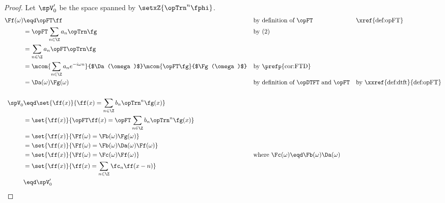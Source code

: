 \begin{proof}
Let $\spV_0'$ be the space spanned by $\setxZ{\opTrn^n\fphi}$.
\begin{align*}
  \Ff(\omega)
    &\eqd \opFT\ff
    &&    \text{by definition of $\opFT$}
    &&    \text{\xref{def:opFT}}
  \\&=    \opFT\sum_{n\in\Z} a_n \opTrn\fg
    &&    \text{by (2)}
  \\&=    \sum_{n\in\Z} a_n \opFT\opTrn\fg
  \\&=    \mcom{\sum_{n\in\Z} a_n e^{-i\omega n}}{$\Da(\omega)$}\mcom{\opFT\fg}{$\Fg(\omega)$}
    &&    \text{by \prefp{cor:FTD}}
  \\&=    \Da(\omega)\Fg(\omega)
    &&    \text{by definition of $\opDTFT$ and $\opFT$}
    &&    \text{by \xxref{def:dtft}{def:opFT}}
\\
\\
  \spV_0
    &\eqd \set{\ff(x)}{\ff(x)=\sum_{n\in\Z} b_n \opTrn^n\fg(x)}
  \\&=    \set{\ff(x)}{\opFT\ff(x)=\opFT\sum_{n\in\Z} b_n \opTrn^n\fg(x)}
  \\&=    \set{\ff(x)}{\Ff(\omega)=\Fb(\omega) \Fg(\omega) }
  \\&=    \set{\ff(x)}{\Ff(\omega)=\Fb(\omega) \Da(\omega) \Ff(\omega) }
  \\&=    \set{\ff(x)}{\Ff(\omega)=\Fc(\omega) \Ff(\omega) }
    &&    \text{where $\Fc(\omega)\eqd\Fb(\omega)\Da(\omega)$}
  \\&=    \set{\ff(x)}{\ff(x)=\sum_{n\in\Z} \fc_{n} \ff(x-n) }
  \\&\eqd \spV_0'
\end{align*}
\end{proof}


